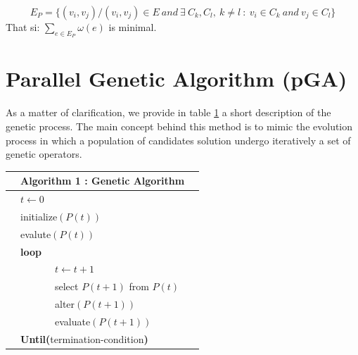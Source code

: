\documentclass[review]{elsarticle}
\begin{document}
\begin{equation}
E_P = \{  (v_i,v_j ) / (v_i,v_j ) \in E \ and  \ \exists \ C_k,C_l, \ k \neq l  \ : \  v_i  \in C_k \  and \ v_j  \in C_l \}
\end{equation}
\noindent That si:    $\sum_{e\in E_P} \omega(e)$  is minimal.

\section{Parallel Genetic Algorithm (pGA)}
As a matter of clarification, we provide in table \ref{tab:AG} a short description of the genetic process. The main concept behind this method is to mimic the evolution process in which a population of candidates solution undergo iteratively a set of genetic operators.

\begin{table}[H]
	\center
	\label{tab:AG} %
	\begin{tabular}{l l l}
		\hline
		& \bf  Algorithm 1 : Genetic Algorithm & \\
		\hline 
		& $t \leftarrow 0$ & \\
		& initialize$(P(t))$ & \\
		& evalute$(P(t))$ & \\
		& \textbf{loop} & \\
		&  \ \ \ \ \ \ \   $t \leftarrow t+1$  &  \\
		&  \ \ \ \ \ \ \  select $P(t+1)$ from $P(t)$ &  \\
		& \ \ \ \ \ \ \   alter$(P(t+1))$ & \\
		& \ \ \ \ \ \ \   evaluate$(P(t+1))$ & \\
		& \textbf{Until(}termination-condition\textbf{)} & \\
		\hline
	\end{tabular}
\end{table}
\end{document}
